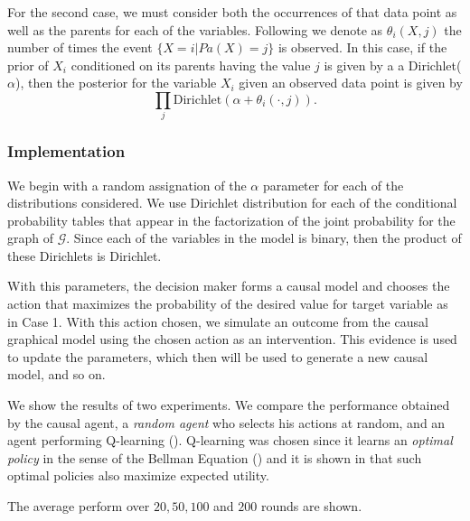 \documentclass[english,letterpaper,12pt,final]{article}
\theoremstyle{definition}
\begin{document}
For the second case, we must consider both the occurrences of that data point as well as the parents for each of the variables. Following \cite{barber2012bayesian} we denote as $\theta_i(X,j)$ the number of times the event $\{X=i | Pa(X)=j\}$ is observed. In this case, if the prior of $X_i$ conditioned on its parents having the value $j$ is given by a a Dirichlet($\alpha$), then the posterior for the variable $X_i$ given an observed data point is given by 
\[ \prod_j \textrm{Dirichlet}(\alpha + \theta_i(\cdot,j)). \]

\subsubsection{Implementation}
We begin with a random assignation of the $\alpha$ parameter for each of the distributions considered. We use Dirichlet distribution for each of the conditional probability tables that appear in the factorization of the joint probability for the graph of $\mathcal{G}$. Since each of the variables in the model is binary, then the product of these Dirichlets is Dirichlet.

With this parameters, the decision maker forms a causal model and chooses the action that maximizes the probability of the desired value for target variable as in Case 1.  With this action chosen, we simulate an outcome from the causal graphical model using the chosen action as an intervention. This evidence is used to update the parameters, which then will be used to generate a new causal model, and so on.

We show the results of two experiments. We compare the performance obtained by the causal agent, a \textit{random agent} who selects his actions at random, and an agent performing Q-learning (\cite{watkins1992q}). Q-learning was chosen since it learns an \textit{optimal policy} in the sense of the Bellman Equation (\cite{sutton1998reinforcement}) and it is shown in \cite{webb2007game} that such optimal policies also maximize expected utility. 

The average perform over $20, 50, 100$ and $200$ rounds are shown.
\end{document}
